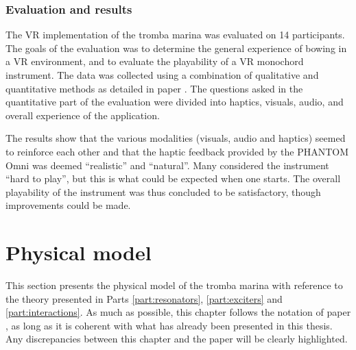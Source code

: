 \subsubsection{Evaluation and results}
The VR implementation of the tromba marina was evaluated on 14 participants. The goals of the evaluation was to determine the general experience of bowing in a VR environment, and to evaluate the playability of a VR monochord instrument.
The data was collected using a combination of qualitative and quantitative methods as detailed in paper \citeP[E]. The questions asked in the quantitative part of the evaluation were divided into haptics, visuals, audio, and overall experience of the application.

The results show that the various modalities (visuals, audio and haptics) seemed to reinforce each other and that the haptic feedback provided by the PHANTOM Omni was deemed ``realistic'' and ``natural''. Many considered the instrument ``hard to play'', but this is what could be expected when one starts. The overall playability of the instrument was thus concluded to be satisfactory, though improvements could be made.

  

\section{Physical model}
This section presents the physical model of the tromba marina with reference to the theory presented in Parts \ref{part:resonators}, \ref{part:exciters} and \ref{part:interactions}.
As much as possible, this chapter follows the notation of paper \citeP[D], as long as it is coherent with what has already been presented in this thesis. Any discrepancies between this chapter and the paper will be clearly highlighted. 

